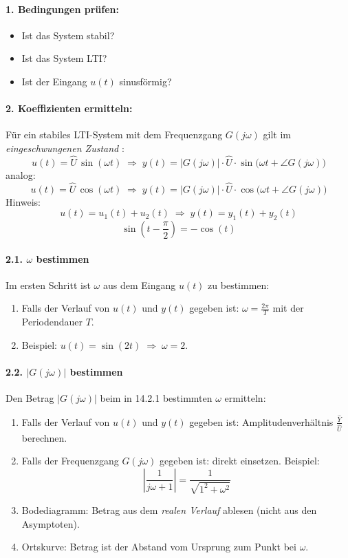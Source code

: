 \documentclass[12pt]{article}
\begin{document}
\paragraph{1. Bedingungen prüfen:}
\begin{itemize}
	\item Ist das System stabil?
	\item Ist das System LTI?
	\item Ist der Eingang $u(t)$ sinusförmig?
\end{itemize}

\paragraph{2. Koeffizienten ermitteln:}
Für ein stabiles LTI-System mit dem Frequenzgang \(G(j\omega)\) gilt im \emph{eingeschwungenen Zustand}\footnotemark
{}
:
\[
u(t)=\hat{U}\,\sin(\omega t)
\;\Rightarrow\;
y(t)=|G(j\omega)|\cdot\hat{U}\cdot\sin\!\bigl(\omega t+\angle G(j\omega)\bigr)
\]
analog:
\[
u(t)=\hat{U}\,\cos(\omega t)
\;\Rightarrow\;
y(t)=|G(j\omega)|\cdot\hat{U}\cdot\cos\!\bigl(\omega t+\angle G(j\omega)\bigr)
\]
Hinweis:
\begin{equation}
	u(t)=u_1(t)+u_2(t)\;\Rightarrow\;y(t)=y_1(t)+y_2(t)
\end{equation}
\begin{equation}
	\sin\left(t-\frac{\pi}{2}\right) = -\cos(t)
\end{equation}
\paragraph{2.1. \(\omega\) bestimmen}
Im ersten Schritt ist \(\omega\) aus dem Eingang \(u(t)\) zu bestimmen:
\begin{enumerate}
	\item Falls der Verlauf von \(u(t)\) und \(y(t)\) gegeben ist: \(\omega=\frac{2\pi}{T}\) mit der Periodendauer \(T\).
	\item Beispiel: \(u(t)=\sin(2t)\;\Rightarrow\;\omega=2\).
\end{enumerate}
\paragraph{2.2. \(|G(j\omega)|\) bestimmen}
Den Betrag \(|G(j\omega)|\) beim in 14.2.1 bestimmten \(\omega\) ermitteln:
\begin{enumerate}
	\item Falls der Verlauf von \(u(t)\) und \(y(t)\) gegeben ist: Amplitudenverhältnis \(\frac{\hat{Y}}{\hat{U}}\) berechnen.
	\item Falls der Frequenzgang \(G(j\omega)\) gegeben ist: direkt einsetzen. Beispiel:
	\[
	\left|\frac{1}{j\omega+1}\right| = \frac{1}{\sqrt{1^2+\omega^2}}
	\]
	\item Bodediagramm: Betrag aus dem \emph{realen Verlauf} ablesen (nicht aus den Asymptoten).
	\item Ortskurve: Betrag ist der Abstand vom Ursprung zum Punkt bei \(\omega\).
\end{enumerate}
\end{document}
